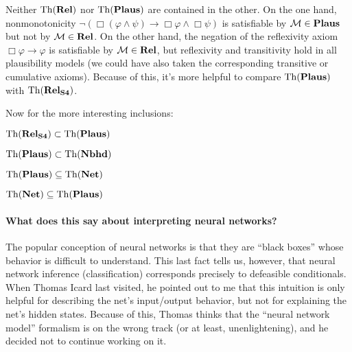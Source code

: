 \documentclass[letterpaper]{article}
\begin{document}
Neither $\mathrm{Th}( \textrm{\textbf{Rel}} )$ nor $\mathrm{Th}( \textrm{\textbf{Plaus}} )$ are contained in the other.  On the one hand, nonmonotonicity $\neg (\Box (\varphi \land \psi) \to \Box \varphi \land \Box \psi)$ is satisfiable by $\mathcal{M} \in \textrm{\textbf{Plaus}}$ but not by $\mathcal{M} \in \textrm{\textbf{Rel}}$.  On the other hand, the negation of the reflexivity axiom $\Box \varphi \to \varphi$ is satisfiable by $\mathcal{M} \in \textrm{\textbf{Rel}}$, but reflexivity and transitivity hold in all plausibility models (we could have also taken the corresponding transitive or cumulative axioms).  Because of this, it's more helpful to compare $\mathrm{Th}( \textrm{\textbf{Plaus}} )$ with $\mathrm{Th}( \textrm{\textbf{Rel}}_\textrm{\textbf{S4}} )$.

Now for the more interesting inclusions:

\begin{proposition}
    $\mathrm{Th}( \textrm{\textbf{Rel}}_\textrm{\textbf{S4}} ) \subset \mathrm{Th}( \textrm{\textbf{Plaus}} )$
\end{proposition}

\begin{proposition}
    $\mathrm{Th}( \textrm{\textbf{Plaus}} ) \subset \mathrm{Th}( \textrm{\textbf{Nbhd}} )$
\end{proposition}


\begin{proposition}
    $\mathrm{Th}( \textrm{\textbf{Plaus}} ) \subseteq \mathrm{Th}( \textrm{\textbf{Net}} )$
\end{proposition}

\begin{proposition}
    $\mathrm{Th}( \textrm{\textbf{Net}} ) \subseteq \mathrm{Th}( \textrm{\textbf{Plaus}} )$
\end{proposition}



\paragraph*{What does this say about interpreting neural networks?}
The popular conception of neural networks is that they are ``black boxes'' whose behavior is difficult to understand.  This last fact tells us, however, that neural network inference (classification) corresponds precisely to defeasible conditionals.  When Thomas Icard last visited, he pointed out to me that this intuition is only helpful for describing the net's input/output behavior, but not for explaining the net's hidden states.  Because of this, Thomas thinks that the ``neural network model'' formalism is on the wrong track (or at least, unenlightening), and he decided not to continue working on it.
\end{document}
